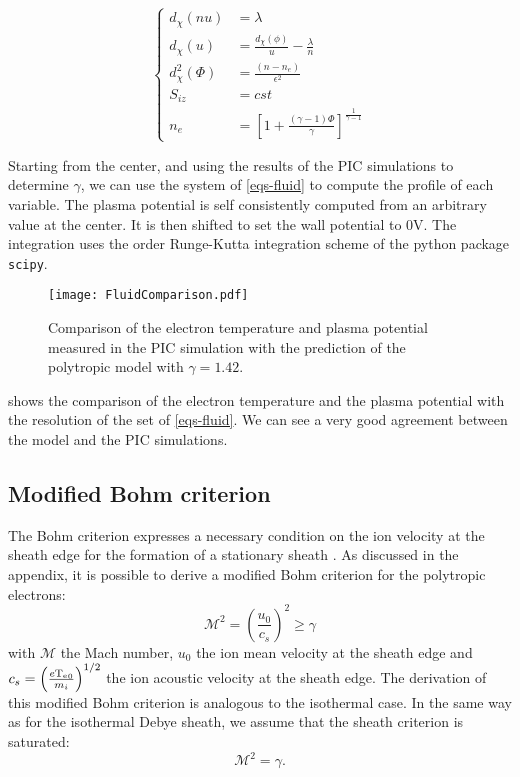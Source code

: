 \begin{equation}
  \label{eqs-fluid}
  \begin{cases}
    d_{\chi} (n u ) &= \lambda\\
    d_{\chi} (u) &= \frac{d_{\chi} (\phi)}{u} - \frac{\lambda}{n}\\
    d_{\chi}^2 (\Phi) &= \frac{(n - n_e)}{\epsilon^2}\\
    S_{iz} &= cst \\
    n_{e} &= \left[ 1 + \frac{(\gamma - 1) \Phi }{\gamma}  \right]^{\frac{1}{\gamma - 1}}
\end{cases}
\end{equation}

Starting from the center, and using the results of the PIC simulations to determine $\gamma$, we can use the system of \cref{eqs-fluid} to compute the profile of each variable.
The plasma potential is self consistently computed from an arbitrary value at the center.
It is then shifted to set the wall potential to 0V.
The integration uses the  order Runge-Kutta integration scheme of the python package \texttt{scipy}.


\begin{figure}[!htbp]
  \centering
  \texttt{[image: FluidComparison.pdf]}
  \caption{Comparison of the electron temperature and plasma potential measured in the PIC simulation with the prediction of the polytropic model with $\gamma = 1.42$.}
  \label{fig-comp}
\end{figure}

 shows the comparison of the electron temperature and the plasma potential with the resolution of the set of \cref{eqs-fluid}.
We can see a very good agreement between the model and the PIC simulations.


\subsection{Modified Bohm criterion}
The Bohm criterion expresses a necessary condition on the ion velocity at the sheath edge for the formation of a stationary sheath \citep{riemann1991}.
As discussed in the appendix, it is possible to derive a modified Bohm criterion for the polytropic electrons:
\begin{equation}
  \mathcal{M}^2 = \left( \frac{u_0}{c_s} \right)^2 \geq \gamma
\end{equation}
with $\mathcal{M}$ the Mach number, $u_0$ the ion mean velocity at the sheath edge and $c_s=\left( \frac{e \mathrm{T_e}_0}{m_i} \right)^{1/2}$ the ion acoustic velocity at the sheath edge. The derivation of this modified Bohm criterion is analogous to the isothermal case.
In the same way as for the isothermal Debye sheath, we assume that the sheath criterion is saturated:
\begin{equation}
  \label{eq-saturation}
  \mathcal{M}^2 = \gamma.
\end{equation}

